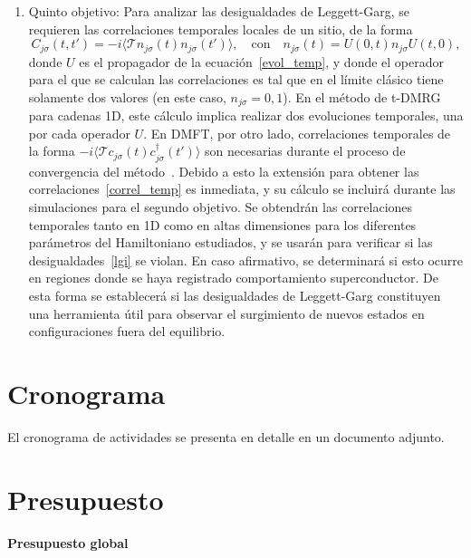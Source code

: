 \documentclass[a4paper,10pt]{article}
\begin{document}
\begin{enumerate}
\item Quinto objetivo: Para analizar las desigualdades de Leggett-Garg, se requieren las correlaciones temporales locales de un sitio, de la forma
\begin{equation} \label{correl_temp}
C_{j\sigma}(t,t')=-i\langle\mathcal{T} n_{j\sigma}(t)n_{j\sigma}(t')\rangle,\quad\text{con}\quad n_{j\sigma}(t)=U(0,t)n_{j\sigma}U(t,0),
\end{equation}
donde $U$ es el propagador de la ecuaci\'on~\eqref{evol_temp}, y donde el operador para el que se calculan las correlaciones es tal que en el l\'imite cl\'asico tiene solamente dos valores (en este caso, $n_{j\sigma}=0,1$). En el m\'etodo de t-DMRG para cadenas 1D, este c\'alculo implica realizar dos evoluciones temporales, una por cada operador $U$. En DMFT, por otro lado, correlaciones temporales de la forma $-i\langle\mathcal{T} c_{j\sigma}(t)c_{j\sigma}^{\dagger}(t')\rangle$ son necesarias durante el proceso de convergencia del m\'etodo~\cite{gramsch2014prb}. Debido a esto la extensi\'on para obtener las correlaciones~\eqref{correl_temp} es inmediata, y su c\'alculo se incluir\'a durante las simulaciones para el segundo objetivo. Se obtendr\'an las correlaciones temporales tanto en 1D como en altas dimensiones para los diferentes par\'ametros del Hamiltoniano estudiados, y se usar\'an para verificar si las desigualdades~\eqref{lgi} se violan. En caso afirmativo, se determinar\'a si esto ocurre en regiones donde se haya registrado comportamiento superconductor. De esta forma se establecer\'a si las desigualdades de Leggett-Garg constituyen una herramienta \'util para observar el surgimiento de nuevos estados en configuraciones fuera del equilibrio.

\end{enumerate}

\section{Cronograma}

El cronograma de actividades se presenta en detalle en un documento adjunto. 

\newpage

\section{Presupuesto}

\textbf{Presupuesto global}
\end{document}
